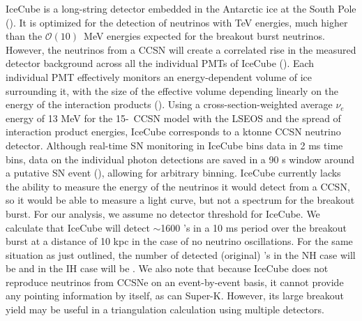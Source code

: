 IceCube is a long-string detector embedded in the Antarctic ice at the
South Pole (\citealp{achterbergetal2006,abbasi2010}). It
is optimized for the detection of neutrinos with TeV energies, much
higher than the $\mathcal{O}(10)$~MeV energies expected for the
breakout burst neutrinos. 
However, the
neutrinos from a CCSN will create a correlated rise in the measured
detector background across all the individual PMTs of IceCube
(\citealp{pryoretal1988,halzenetal1996}).  
Each individual PMT effectively monitors 
an energy-dependent volume of ice surrounding it, with the 
size of the effective volume depending linearly on the 
energy of the interaction products (\citealt{abbasietal2011}).  
Using a cross-section-weighted average $\nu_e$ energy of 13 MeV 
for the 15-\Msol\ CCSN model with the LSEOS and the spread of interaction 
product energies, IceCube corresponds to a  ktonne 
CCSN neutrino detector.
Although real-time SN monitoring in IceCube bins data 
in 2 ms time bins, data on the individual photon detections 
are saved in a 90 s window around a putative SN 
event (\citealt{aartsenetal2013}), allowing for arbitrary binning.
IceCube
currently lacks the ability to measure the energy of the neutrinos it
would detect from a CCSN, so it would be able to measure a light curve, but
not a spectrum for the breakout burst.  For our analysis, we assume no
detector threshold for IceCube.  We calculate that 
IceCube  will detect 
$\sim$1600 \nue's in a 10 ms period over the
breakout burst at a distance of 10 kpc in the case of no neutrino
oscillations.  For the same situation as just outlined, the number of
detected (original) \nue's in the NH case will be  and in the IH
case will be .  We also note that because
IceCube does not reproduce neutrinos from CCSNe on an event-by-event
basis, it cannot provide any pointing information by itself, as can
Super-K.  However, its large breakout yield may be useful
in a triangulation calculation using multiple detectors.

